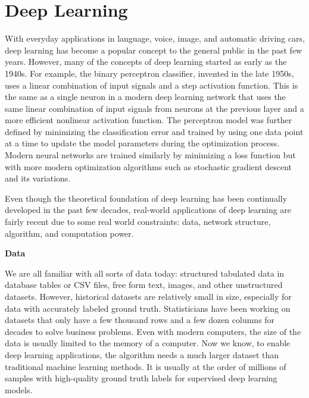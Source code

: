 \documentclass[
  12pt,
]{krantz}
\begin{document}
\hypertarget{deeplearning}{%
\chapter{Deep Learning}\label{deeplearning}}

With everyday applications in language, voice, image, and automatic driving cars, deep learning has become a popular concept to the general public in the past few years. However, many of the concepts of deep learning started as early as the 1940s. For example, the binary perceptron classifier, invented in the late 1950s, uses a linear combination of input signals and a step activation function. This is the same as a single neuron in a modern deep learning network that uses the same linear combination of input signals from neurons at the previous layer and a more efficient nonlinear activation function. The perceptron model was further defined by minimizing the classification error and trained by using one data point at a time to update the model parameters during the optimization process. Modern neural networks are trained similarly by minimizing a loss function but with more modern optimization algorithms such as stochastic gradient descent and its variations.

Even though the theoretical foundation of deep learning has been continually developed in the past few decades, real-world applications of deep learning are fairly recent due to some real world constraints: data, network structure, algorithm, and computation power.

\textbf{Data}

We are all familiar with all sorts of data today: structured tabulated data in database tables or CSV files, free form text, images, and other unstructured datasets. However, historical datasets are relatively small in size, especially for data with accurately labeled ground truth. Statisticians have been working on datasets that only have a few thousand rows and a few dozen columns for decades to solve business problems. Even with modern computers, the size of the data is usually limited to the memory of a computer. Now we know, to enable deep learning applications, the algorithm needs a much larger dataset than traditional machine learning methods. It is usually at the order of millions of samples with high-quality ground truth labels for supervised deep learning models.
\end{document}
